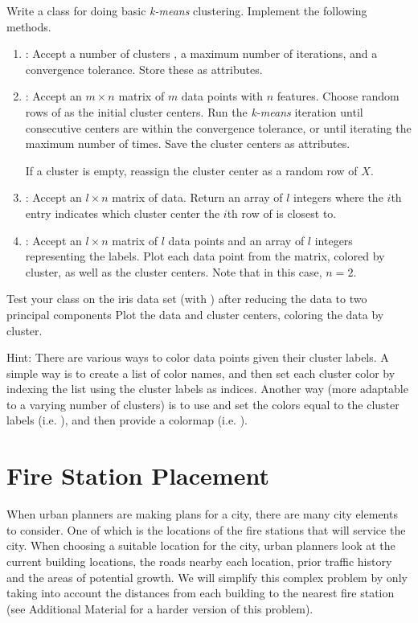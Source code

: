 \begin{problem}
Write a  class for doing basic \emph{k-means} clustering.
Implement the following methods.
\begin{enumerate}
\item {}: Accept a number of clusters , a maximum number of iterations, and a convergence tolerance.
Store these as attributes.

\item {}: Accept an $m \times n$ matrix  of $m$ data points with $n$ features.
Choose  random rows of  as the initial cluster centers.
Run the \emph{k-means} iteration until consecutive centers are within the convergence tolerance, or until iterating the maximum number of times.
Save the cluster centers as attributes.

If a cluster is empty, reassign the cluster center as a random row of $X$.

\item {}: Accept an $l \times n$ matrix  of data.
Return an array of $l$ integers where the $i$th entry indicates which cluster center the $i$th row of  is closest to.

\item {}: Accept an $l \times n$ matrix  of $l$ data points and an array  of $l$ integers representing the labels.
Plot each data point from the matrix, colored by cluster, as well as the cluster centers.
Note that in this case, $n = 2$.
\end{enumerate}
%
Test your class on the iris data set (with ) after reducing the data to two principal components
Plot the data and cluster centers, coloring the data by cluster.

Hint: There are various ways to color data points given their cluster labels.
A simple way is to create a list of color names, and then set each cluster color by indexing the list using the cluster labels as indices.
Another way (more adaptable to a varying number of clusters) is to use  and set the colors  equal to the cluster labels  (i.e. ), and then provide a colormap (i.e. ).
\label{eq:prob1}
\end{problem}

\section*{Fire Station Placement} %
When urban planners are making plans for a city, there are many city elements to consider. 
One of which is the locations of the fire stations that will service the city.
When choosing a suitable location for the city, urban planners look at the current building locations, the roads nearby each location, prior traffic history and the areas of potential growth.
We will simplify this complex problem by only taking into account the distances from each building to the nearest fire station (see Additional Material for a harder version of this problem).

